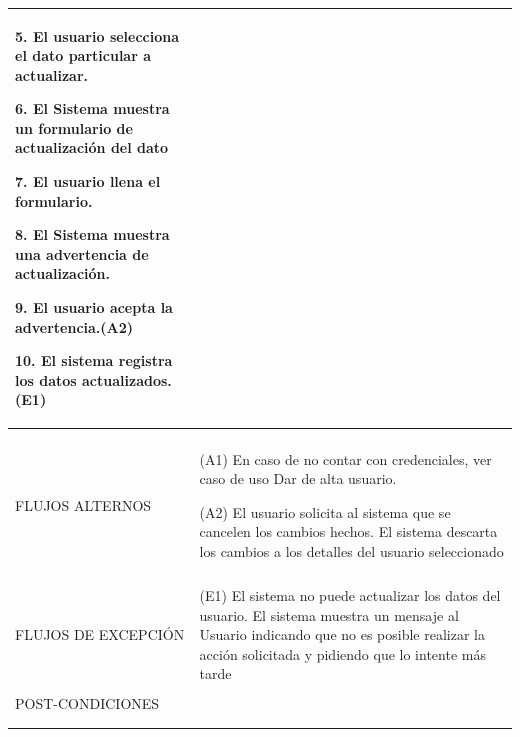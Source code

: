 \begin{longtable}{@{\extracolsep{8pt}}l p{8.5cm}}
 5. El usuario selecciona el dato particular a actualizar. \par\vspace{.1cm}

 6. El Sistema muestra un formulario de actualización del dato \par\vspace{.1cm}

 7. El usuario llena el formulario. \par\vspace{.1cm}

 8. El Sistema muestra una advertencia de actualización. \par\vspace{.1cm}

 9. El usuario acepta la advertencia.(A2) \par\vspace{.1cm}

 10. El sistema registra los datos actualizados.(E1) \par\vspace{.1cm}

\\
\hline \\[-1ex]

FLUJOS ALTERNOS & 
\par (A1) En caso de no contar con credenciales, ver caso de uso Dar de alta usuario.

\par (A2) El usuario solicita al sistema que se cancelen los cambios hechos. El sistema descarta los cambios a los detalles del usuario seleccionado

\par 



\\
\hline \\[-1ex]

FLUJOS DE EXCEPCIÓN & 
\par\vspace{.1cm} (E1) El sistema no puede actualizar los datos del usuario. El sistema muestra un mensaje al Usuario indicando que no es posible realizar la acción solicitada y pidiendo que lo intente más tarde


\\%

\hline \\[-1ex]
POST-CONDICIONES & 
\\
\hline
\hline \\[-1.8ex]
 \\
\end{longtable}


